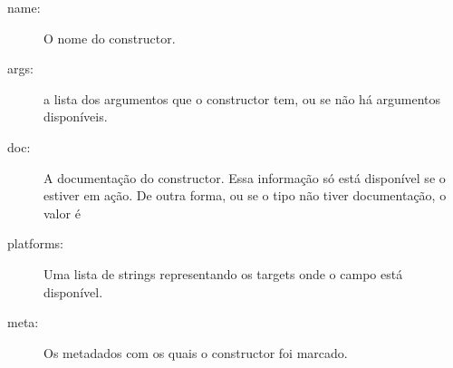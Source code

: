 \begin{description}
    \item[name:] O nome do constructor.
    \item[args:] a lista dos argumentos que o constructor tem, ou  se não há argumentos disponíveis.
    \item[doc:] A documentação do constructor. Essa informação só está disponível se o   estiver em ação. De outra forma, ou se o tipo não tiver documentação, o valor é 
    \item[platforms:] Uma lista de strings representando os targets onde o campo está disponível.
    \item[meta:] Os metadados com os quais o constructor foi marcado.
\end{description}
